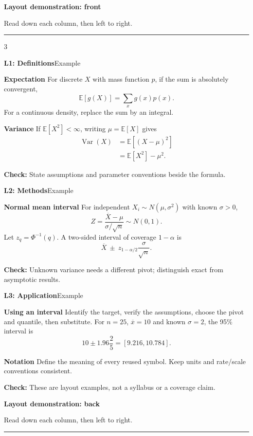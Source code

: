 \documentclass[a4paper]{article}
\newcommand{\sheettitle}[1]{%
  {\fontsize{11}{12}\selectfont\bfseries #1}\par
  {\fontsize{7}{8}\selectfont Read down each column, then left to right.}\par
  \vspace{2pt}\hrule\vspace{2pt}}
\newcommand{\topic}[2]{%
  \par\vspace{3pt}\noindent
  \colorbox{black!10}{\parbox{\dimexpr\linewidth-2\fboxsep\relax}{%
    \textbf{#1}\hfill{\fontsize{7}{8}\selectfont #2}}}\par}
\newcommand{\method}[1]{\par\textbf{#1}\enspace}
\newcommand{\caution}[1]{\par\textbf{Check: }#1\par}
\newcommand{\E}{\mathbb{E}}
\newcommand{\Var}{\operatorname{Var}}
\begin{document}
\fontsize{8}{9.2}\selectfont
\setlength{\abovedisplayskip}{3pt}
\setlength{\belowdisplayskip}{3pt}
\setlength{\abovedisplayshortskip}{2pt}
\setlength{\belowdisplayshortskip}{2pt}
\setlength{\jot}{1pt}
\sheettitle{Layout demonstration: front}
\begin{multicols*}{3}
\topic{L1: Definitions}{Example}
\method{Expectation}
For discrete $X$ with mass function $p$, if the sum is absolutely convergent,
\[
  \E[g(X)]=\sum_x g(x)p(x).
\]
For a continuous density, replace the sum by an integral.
\method{Variance}
If $\E[X^2]<\infty$, writing $\mu=\E[X]$ gives
\[
\begin{aligned}
 \Var(X)&=\E[(X-\mu)^2]\\
        &=\E[X^2]-\mu^2.
\end{aligned}
\]
\caution{State assumptions and parameter conventions beside the formula.}
\columnbreak
\topic{L2: Methods}{Example}
\method{Normal mean interval}
For independent $X_i\sim N(\mu,\sigma^2)$ with known $\sigma>0$,
\[
 Z=\frac{\overline X-\mu}{\sigma/\sqrt n}\sim N(0,1).
\]
Let $z_q=\Phi^{-1}(q)$. A two-sided interval of coverage $1-\alpha$ is
\[
 \overline X\ \pm\ z_{1-\alpha/2}\frac{\sigma}{\sqrt n}.
\]
\caution{Unknown variance needs a different pivot; distinguish exact from asymptotic results.}
\columnbreak
\topic{L3: Application}{Example}
\method{Using an interval}
Identify the target, verify the assumptions, choose the pivot and quantile, then substitute.
For $n=25$, $\overline x=10$ and known $\sigma=2$, the 95\% interval is
\[
 10\pm 1.96\frac{2}{5}=[9.216,10.784].
\]
\method{Notation}
Define the meaning of every reused symbol. Keep units and rate/scale conventions consistent.
\caution{These are layout examples, not a syllabus or a coverage claim.}
\end{multicols*}
\newpage
\sheettitle{Layout demonstration: back}
\end{document}
